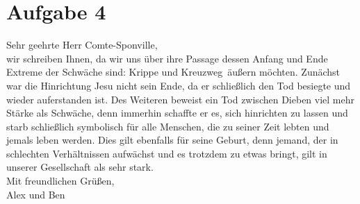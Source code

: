 \documentclass[11pt, a4paper]{report}
\begin{document}
	\chapter{Aufgabe 4}
	Sehr geehrte Herr Comte-Sponville,
	\\
	wir schreiben Ihnen, da wir uns über ihre Passage \dq dessen Anfang und Ende Extreme der Schwäche sind: Krippe und Kreuzweg\dq\  äußern möchten.
	Zunächst war die Hinrichtung Jesu nicht sein Ende, da er schließlich den Tod besiegte und wieder auferstanden ist.
	Des Weiteren beweist ein Tod zwischen Dieben viel mehr Stärke als Schwäche, denn immerhin schaffte er es, sich hinrichten zu lassen und starb schließlich symbolisch für alle Menschen, die zu seiner Zeit lebten und jemals leben werden.	Dies gilt ebenfalls f\"ur seine Geburt, denn jemand, der in schlechten Verh\"altnissen aufw\"achst und es trotzdem zu etwas bringt, gilt in unserer Gesellschaft als sehr stark.
	\\
	Mit freundlichen Grüßen,
	\\
	Alex und Ben
\end{document}
